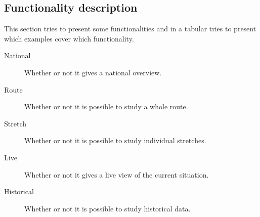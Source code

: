 
\clearpage
\subsection{Functionality description} %
\label{sub:functionality_description}
This section tries to present some functionalities and in a tabular tries to
present which examples cover which functionality. 
\begin{description}
	\item [National]	Whether or not it gives a national overview.
	\item [Route]		Whether or not it is possible to study a whole route.
	\item [Stretch]		Whether or not it is possible to study individual 						stretches.
	\item [Live]		Whether or not it gives a live view of the current 						situation.
	\item [Historical]	Whether or not it is possible to study historical data.
\end{description}

